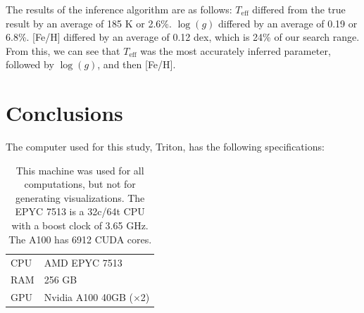 \documentclass[twocolumn]{aastex631}
\begin{document}
The results of the inference algorithm are as follows: $T_{\mathrm{eff}}$ differed from the true result by an average of 185 K or 2.6\%. 
$\log(g)$ differed by an average of 0.19 or 6.8\%. [Fe/H] differed by an average of 0.12 dex, which is 24\% of our search range.
From this, we can see that $T_{\mathrm{eff}}$ was the most accurately inferred parameter, followed by $\log(g)$, and then [Fe/H].

\section{Conclusions}
The computer used for this study, Triton, has the following specifications:
\begin{table}[h!]
    \centering
    \begin{tabular}{ll}
        \hline
        CPU & AMD EPYC 7513\\
        RAM & 256 GB\\
        GPU & Nvidia A100 40GB ($\times$2)\\
        \hline
    \end{tabular}
    \caption{This machine was used for all computations, but not for generating visualizations. The EPYC 7513 is a 32c/64t CPU with a boost clock of 3.65 GHz. The A100 has 6912 CUDA cores.}
\end{table}
\end{document}
